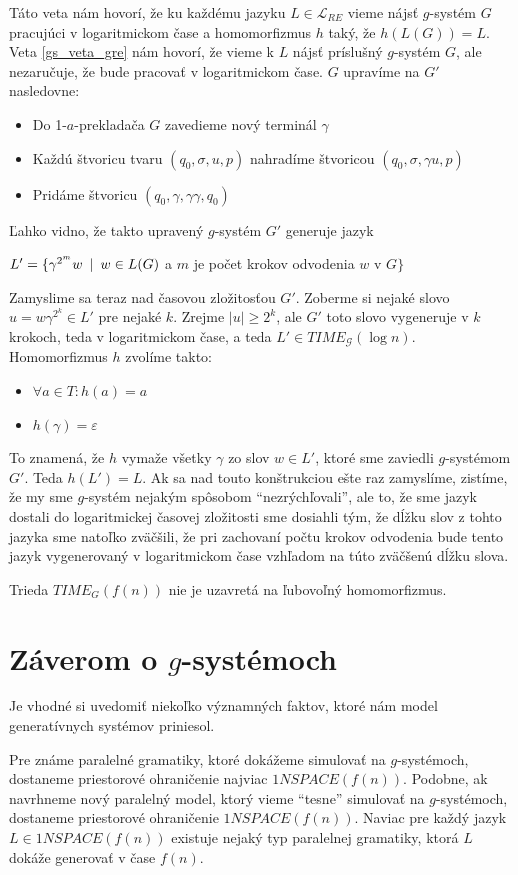 \begin{dokaz}
  Táto veta nám hovorí, že ku každému jazyku $L\in\mathcal{L}_{RE}$
  vieme nájsť $g$-systém $G$ pracujúci v logaritmickom čase a
  homomorfizmus $h$ taký, že $h(L(G))=L$. Veta \ref{gs_veta_gre} nám
  hovorí, že vieme k $L$ nájsť príslušný $g$-systém $G$, ale
  nezaručuje, že bude pracovať v logaritmickom čase. $G$ upravíme na
  $G'$ nasledovne:
  \begin{itemize}
    \item Do 1-$a$-prekladača $G$ zavedieme nový terminál $\gamma$
    \item Každú štvoricu tvaru $(q_0,\sigma ,u,p)$ nahradíme štvoricou $(q_0,\sigma ,\gamma u,p)$
    \item Pridáme štvoricu $(q_0,\gamma,\gamma\gamma,q_0)$
  \end{itemize}
  Ľahko vidno, že takto upravený $g$-systém $G'$ generuje jazyk

  \centerline{$L'=\{\gamma^{2^m} w\enspace |\enspace w\in L(G)$ a $m$ je počet
  krokov odvodenia $w$ v $G\}$} Zamyslime sa teraz nad časovou
  zložitosťou $G'$. Zoberme si nejaké slovo $u=w{\gamma}^{2^k}\in
  L'$ pre nejaké $k$. Zrejme $|u|\geq 2^k$, ale $G'$ toto slovo
  vygeneruje v $k$ krokoch, teda v logaritmickom čase, a teda $L'\in
  TIME_{\mathcal{G}}(\log n)$. Homomorfizmus $h$ zvolíme takto:
  \begin{itemize}
    \item $\forall a\in T: h(a)=a$
    \item $h(\gamma)=\varepsilon$
  \end{itemize}
  To znamená, že $h$ vymaže všetky $\gamma$ zo slov $w\in L'$, ktoré
  sme zaviedli $g$-systémom $G'$. Teda $h(L')=L$. Ak sa nad touto
  konštrukciou ešte raz zamyslíme, zistíme, že my sme $g$-systém
  nejakým spôsobom ``nezrýchľovali'', ale to, že sme jazyk dostali
  do logaritmickej časovej zložitosti sme dosiahli tým, že dĺžku
  slov z tohto jazyka sme natoľko zväčšili, že pri zachovaní počtu
  krokov odvodenia bude tento jazyk vygenerovaný v logaritmickom
  čase vzhľadom na túto zväčšenú dĺžku slova.
\end{dokaz}

\begin{dosledok}
  Trieda $TIME_{G}(f(n))$ nie je uzavretá na ľubovoľný
  homomorfizmus.
\end{dosledok}

\section{Záverom o $g$-systémoch}

Je vhodné si uvedomiť niekoľko významných faktov, ktoré nám model
generatívnych systémov priniesol.

Pre známe paralelné gramatiky, ktoré dokážeme simulovať na
$g$-systémoch, dostaneme priestorové ohraničenie najviac
$1NSPACE(f(n))$. Podobne, ak navrhneme nový paralelný model, ktorý
vieme ``tesne'' simulovať na $g$-systémoch, dostaneme priestorové
ohraničenie $1NSPACE(f(n))$. Naviac pre každý jazyk $L\in
1NSPACE(f(n))$ existuje nejaký typ paralelnej gramatiky, ktorá $L$
dokáže generovať v čase $f(n)$.
